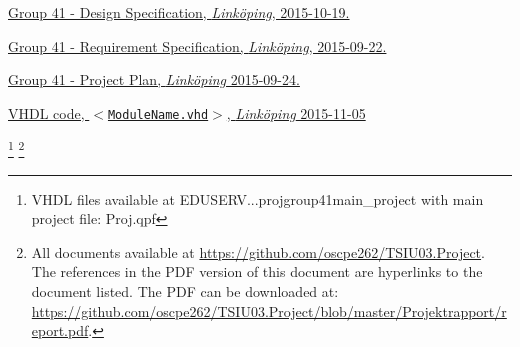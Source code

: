 




\renewcommand*{\refname}{References to the Project Files}
\begin{thebibliography}{99}\label{cha:refs}

  \href{https://github.com/oscpe262/TSIU03.Project/blob/master/Designspec/designspec.pdf}{
    Group 41 - Design Specification,
    \emph{Linköping},
    2015-10-19.
  }

  \href{https://github.com/oscpe262/TSIU03.Project/blob/master/Kravspec/Kravspecifikation.pdf}{
    Group 41 - Requirement Specification,
    \emph{Linköping},
    2015-09-22.
  }
  
  
  \href{https://github.com/oscpe262/TSIU03.Project/blob/master/Projektplan/Project.plan.pdf}{
    Group 41 - Project Plan,
    \emph{Linköping}
    2015-09-24.
  }
  

  \href{https://github.com/oscpe262/TSIU03.Project/blob/master/Kod/main.project/}{
    VHDL code,
    \texttt{$<$ModuleName.vhd$>$},
    \emph{Linköping}
    2015-11-05
  }
  
\end{thebibliography}



\let\thefootnote\relax\footnote{VHDL files available at \tb\tb{}EDUSERV\tb{}...\tb{}projgroup41\tb{}main\_project with main project file: Proj.qpf}
\let\thefootnote\relax\footnote{All documents available at \url{https://github.com/oscpe262/TSIU03.Project}. The references in the PDF version of this document are hyperlinks to the document listed. The PDF can be downloaded at: \\\url{https://github.com/oscpe262/TSIU03.Project/blob/master/Projektrapport/report.pdf}.}

